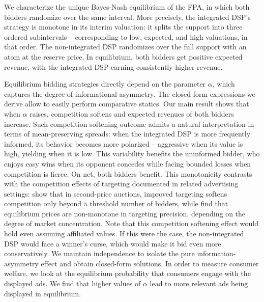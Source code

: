 \documentclass[11pt]{article}
\theoremstyle{plain}
\theoremstyle{definition}
\theoremstyle{plain}
\theoremstyle{plain}
\theoremstyle{plain}
\theoremstyle{plain}
\numberwithin{equation}{section}
\begin{document}
We characterize the unique Bayes-Nash equilibrium of the FPA, in which both bidders randomize over the same interval. More precisely, the integrated DSP's strategy is monotone in its interim valuation: it splits the support into three ordered subintervals -- corresponding to low, expected, and high valuations, in that order. The non-integrated DSP randomizes over the full support with an atom at the reserve price. In equilibrium, both bidders get positive expected revenue, with the integrated DSP earning consistently higher revenue. \par 
Equilibrium bidding strategies directly depend on the parameter $ \alpha $, which captures the degree of informational asymmetry. The closed-form expressions we derive allow to easily perform comparative statics. Our main result shows that when $ \alpha $ raises, competition softens and expected revenues of both bidders increase. Such competition softening outcome admits a natural interpretation in terms of mean-preserving spreads: when the integrated DSP is more frequently informed, its behavior becomes more polarized -- aggressive when its value is high, yielding when it is low. This variability benefits the uninformed bidder, who enjoys easy wins when its opponent concedes while facing bounded losses when competition is fierce. On net, both bidders benefit. This monotonicity contrasts with the competition effects of targeting documented in related advertising settings: \textcite{hummelWhenDoesImproved2017} show that in second-price auctions, improved targeting softens competition only beyond a threshold number of bidders, while \textcite{bergemannTargetingAdvertisingMarkets2011} find that equilibrium prices are non-monotone in targeting precision, depending on the degree of market concentration. Note that this competition softening effect would hold even assuming affiliated values. If this were the case, the non-integrated DSP would face a winner's curse, which would make it bid even more conservatively. We maintain independence to isolate the pure information-asymmetry effect and obtain closed-form solutions. In order to measure consumer welfare, we look at the equilibrium probability that consumers engage with the displayed ads. We find that higher values of $ \alpha $ lead to more relevant ads being displayed in equilibrium. \par
\vspace{2mm}
\end{document}
